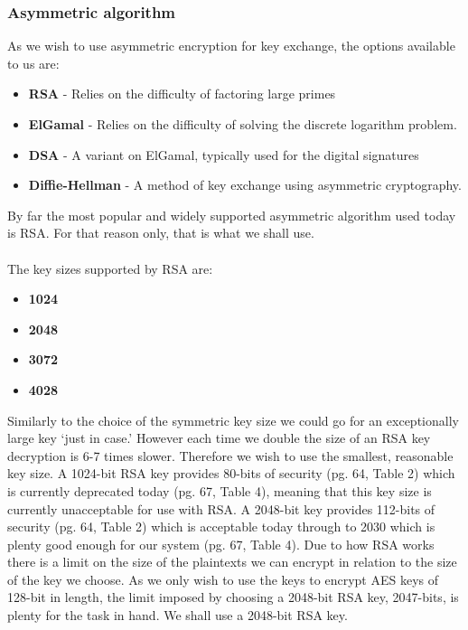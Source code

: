 \documentclass[12pt, titlepage]{article}
\begin{document}
\subsubsection{Asymmetric algorithm}
As we wish to use asymmetric encryption for key exchange, the options available to us are:
\begin{itemize}
	\item \textbf{RSA} - Relies on the difficulty of factoring large primes
	\item \textbf{ElGamal} - Relies on the difficulty of solving the discrete logarithm problem.
	\item \textbf{DSA} - A variant on ElGamal, typically used for the digital signatures
	\item \textbf{Diffie-Hellman} - A method of key exchange using asymmetric cryptography.
\end{itemize}
By far the most popular and widely supported asymmetric algorithm used today is RSA. For that reason only, that is what we shall use.
\\
\\
The key sizes supported by RSA are:
\begin{itemize}
	\item \textbf{1024}
	\item \textbf{2048}
	\item \textbf{3072}
	\item \textbf{4028}
\end{itemize}
Similarly to the choice of the symmetric key size we could go for an exceptionally large key `just in case.' However each time we double the size of an RSA key decryption is 6-7 times slower.\cite{rsaKeyLengths}
Therefore we wish to use the smallest, reasonable key size. A 1024-bit RSA key provides 80-bits of security (pg. 64, Table 2) which is currently deprecated today (pg. 67, Table 4), meaning that this key size is currently unacceptable for use with RSA. A 2048-bit key provides 112-bits of security (pg. 64, Table 2) which is acceptable today through to 2030 which is plenty good enough for our system (pg. 67, Table 4).\cite{nistKeys}
\newline \indent Due to how RSA works there is a limit on the size of the plaintexts we can encrypt in relation to the size of the key we choose. As we only wish to use the keys to encrypt AES keys of 128-bit in length, the limit imposed by choosing a 2048-bit RSA key, 2047-bits, is plenty for the task in hand.
\newline We shall use a 2048-bit RSA key.
\\
\end{document}
